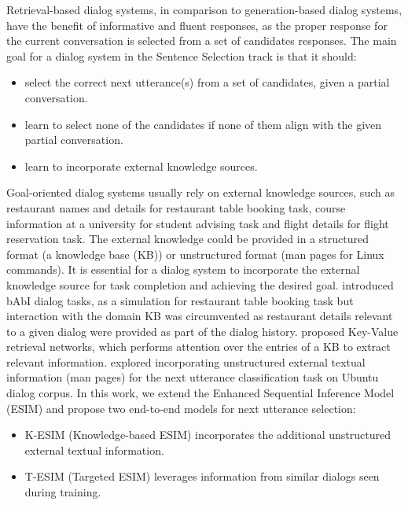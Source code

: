 \documentclass[letterpaper]{article} %
\begin{document}
Retrieval-based dialog systems, in comparison to generation-based dialog systems, have the benefit of informative and fluent responses, as the proper response for the current conversation is selected from a set of candidates responses. The main goal for a dialog system in the Sentence Selection track is that it should:
\begin{itemize}
    \item select the correct next utterance(s) from a set of candidates, given a partial conversation.
    \item learn to select none of the candidates if none of them align with the given partial conversation.
    \item learn to incorporate external knowledge sources.
\end{itemize}

Goal-oriented dialog systems usually rely on external knowledge sources, such as restaurant names and details for restaurant table booking task, course information at a university for student advising task and flight details for flight reservation task. The external knowledge could be provided in a structured format (a knowledge base (KB)) or unstructured format (man pages for Linux commands). It is essential for a dialog system to incorporate the external knowledge source for task completion and achieving the desired goal. \citeauthor{bordes2016learning}  introduced bAbI dialog tasks, as a simulation for restaurant table booking task but interaction with the domain KB was circumvented as restaurant details relevant to a given dialog were provided as part of the dialog history. \citeauthor{eric2017key}  proposed Key-Value retrieval networks, which performs attention over the entries of a KB to extract relevant information. \citeauthor{lowe2015incorporating}  explored incorporating unstructured external textual information (man pages) for the next utterance classification task on Ubuntu dialog corpus. In this work, we extend the Enhanced Sequential Inference Model (ESIM) \cite{chen2017enhanced} and propose two end-to-end models for next utterance selection:

\begin{itemize}
    \item K-ESIM (Knowledge-based ESIM) incorporates the additional unstructured external textual information.
    \item T-ESIM (Targeted ESIM) leverages information from similar dialogs seen during training.
\end{itemize}
\end{document}
